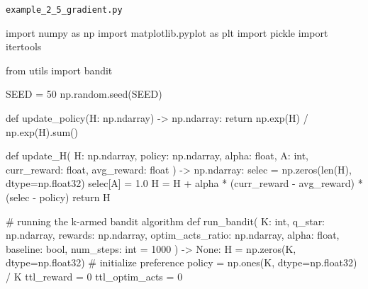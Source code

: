 \documentclass[
  letterpaper,
]{krantz}
\makeatletter
\newenvironment{Shaded}{\begin{snugshade}}{\end{snugshade}}
\newcommand{\BuiltInTok}[1]{\textcolor[rgb]{0.00,0.23,0.31}{#1}}
\newcommand{\CommentTok}[1]{\textcolor[rgb]{0.37,0.37,0.37}{#1}}
\newcommand{\ControlFlowTok}[1]{\textcolor[rgb]{0.00,0.23,0.31}{#1}}
\newcommand{\DecValTok}[1]{\textcolor[rgb]{0.68,0.00,0.00}{#1}}
\newcommand{\FloatTok}[1]{\textcolor[rgb]{0.68,0.00,0.00}{#1}}
\newcommand{\ImportTok}[1]{\textcolor[rgb]{0.00,0.46,0.62}{#1}}
\newcommand{\KeywordTok}[1]{\textcolor[rgb]{0.00,0.23,0.31}{#1}}
\newcommand{\NormalTok}[1]{\textcolor[rgb]{0.00,0.23,0.31}{#1}}
\newcommand{\OperatorTok}[1]{\textcolor[rgb]{0.37,0.37,0.37}{#1}}
\newcommand{\VariableTok}[1]{\textcolor[rgb]{0.07,0.07,0.07}{#1}}
\newenvironment{kframe}{%
\medskip{}
\setlength{\fboxsep}{.8em}
 \def\at@end@of@kframe{}%
 \ifinner\ifhmode%
  \def\at@end@of@kframe{\end{minipage}}%
  \begin{minipage}{\columnwidth}%
 \fi\fi%
 \def\FrameCommand##1{\hskip\@totalleftmargin \hskip-\fboxsep
 \colorbox{shadecolor}{##1}\hskip-\fboxsep
     \hskip-\linewidth \hskip-\@totalleftmargin \hskip\columnwidth}%
 \MakeFramed {\advance\hsize-\width
   \@totalleftmargin\z@ \linewidth\hsize
   \@setminipage}}%
 {\par\unskip\endMakeFramed%
 \at@end@of@kframe}
\renewenvironment{Shaded}{\begin{kframe}}{\end{kframe}}
\theoremstyle{plain}
\theoremstyle{definition}
\theoremstyle{definition}
\theoremstyle{remark}
\makeatother
\begin{document}
\begin{codelisting}

\caption{\texttt{example\_2\_5\_gradient.py}}

\begin{Shaded}
\begin{Highlighting}[]
\ImportTok{import}\NormalTok{ numpy }\ImportTok{as}\NormalTok{ np}
\ImportTok{import}\NormalTok{ matplotlib.pyplot }\ImportTok{as}\NormalTok{ plt}
\ImportTok{import}\NormalTok{ pickle}
\ImportTok{import}\NormalTok{ itertools}

\ImportTok{from}\NormalTok{ utils }\ImportTok{import}\NormalTok{ bandit}

\NormalTok{SEED }\OperatorTok{=} \DecValTok{50}
\NormalTok{np.random.seed(SEED)}


\KeywordTok{def}\NormalTok{ update\_policy(H: np.ndarray) }\OperatorTok{{-}\textgreater{}}\NormalTok{ np.ndarray:}
    \ControlFlowTok{return}\NormalTok{ np.exp(H) }\OperatorTok{/}\NormalTok{ np.exp(H).}\BuiltInTok{sum}\NormalTok{()}


\KeywordTok{def}\NormalTok{ update\_H(}
\NormalTok{        H: np.ndarray,}
\NormalTok{        policy: np.ndarray,}
\NormalTok{        alpha: }\BuiltInTok{float}\NormalTok{,}
\NormalTok{        A: }\BuiltInTok{int}\NormalTok{,}
\NormalTok{        curr\_reward: }\BuiltInTok{float}\NormalTok{,}
\NormalTok{        avg\_reward: }\BuiltInTok{float}
\NormalTok{        ) }\OperatorTok{{-}\textgreater{}}\NormalTok{ np.ndarray:}
\NormalTok{    selec }\OperatorTok{=}\NormalTok{ np.zeros(}\BuiltInTok{len}\NormalTok{(H), dtype}\OperatorTok{=}\NormalTok{np.float32)}
\NormalTok{    selec[A] }\OperatorTok{=} \FloatTok{1.0}
\NormalTok{    H }\OperatorTok{=}\NormalTok{ H }\OperatorTok{+}\NormalTok{ alpha }\OperatorTok{*}\NormalTok{ (curr\_reward }\OperatorTok{{-}}\NormalTok{ avg\_reward) }\OperatorTok{*}\NormalTok{ (selec }\OperatorTok{{-}}\NormalTok{ policy)}
    \ControlFlowTok{return}\NormalTok{ H}


\CommentTok{\# running the k{-}armed bandit algorithm}
\KeywordTok{def}\NormalTok{ run\_bandit(}
\NormalTok{        K: }\BuiltInTok{int}\NormalTok{,}
\NormalTok{        q\_star: np.ndarray,}
\NormalTok{        rewards: np.ndarray,}
\NormalTok{        optim\_acts\_ratio: np.ndarray,}
\NormalTok{        alpha: }\BuiltInTok{float}\NormalTok{,}
\NormalTok{        baseline: }\BuiltInTok{bool}\NormalTok{,}
\NormalTok{        num\_steps: }\BuiltInTok{int} \OperatorTok{=} \DecValTok{1000}
\NormalTok{        ) }\OperatorTok{{-}\textgreater{}} \VariableTok{None}\NormalTok{:}
\NormalTok{    H }\OperatorTok{=}\NormalTok{ np.zeros(K, dtype}\OperatorTok{=}\NormalTok{np.float32)  }\CommentTok{\# initialize preference}
\NormalTok{    policy }\OperatorTok{=}\NormalTok{ np.ones(K, dtype}\OperatorTok{=}\NormalTok{np.float32) }\OperatorTok{/}\NormalTok{ K}
\NormalTok{    ttl\_reward }\OperatorTok{=} \DecValTok{0}
\NormalTok{    ttl\_optim\_acts }\OperatorTok{=} \DecValTok{0}
    

\end{Highlighting}
\end{Shaded}
\end{codelisting}
\end{document}

